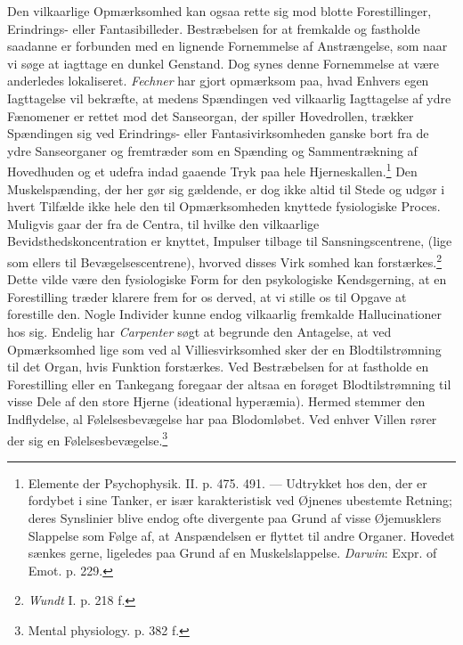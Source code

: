 \documentclass[12pt,a4paper,openany]{book}
\newcommand{\opage}[1]{\marginnote{\footnotesize\textit{[#1]}}}
\begin{document}
Den vilkaarlige Opmærksomhed kan ogsaa rette sig mod blotte
Forestillinger, Erindrings- eller Fantasibilleder. Bestræbelsen for at
fremkalde og fastholde saadanne er forbunden med en lignende Fornemmelse
af Anstrængelse, som naar vi søge at iagttage en dunkel Genstand. Dog
synes denne Fornemmelse at være anderledes lokaliseret. \emph{Fechner}
har gjort opmærksom paa, hvad Enhvers egen Iagttagelse vil bekræfte, at
medens Spændingen ved vilkaarlig Iagttagelse af ydre Fænomener er rettet
mod det Sanseorgan, der spiller Hovedrollen, trækker Spændingen sig ved
Erindrings- eller Fantasivirksomheden ganske bort fra de ydre
Sanseorganer og fremtræder som en Spænding og Sammentrækning af
Hovedhuden og et udefra indad gaaende Tryk paa hele
Hjerneskallen.\footnote[1]{Elemente der Psychophysik. II. p. 475. 491.
--- Udtrykket hos den, der er fordybet i sine Tanker, er især
karakteristisk ved Øjnenes ubestemte Retning; deres Synslinier blive
endog ofte divergente paa Grund af visse Øjemusklers Slappelse som Følge
af, at Anspændelsen er flyttet til andre Organer. Hovedet sænkes gerne,
ligeledes paa Grund af en Muskelslappelse. \emph{Darwin}: Expr. of Emot.
p. 229.} Den Muskelspænding, der her gør sig gældende, er dog ikke altid
til Stede og udgør i hvert Tilfælde ikke hele den til Opmærksomheden
knyttede fysiologiske Proces. Muligvis gaar der fra de Centra, til
hvilke den vilkaarlige Bevidsthedskoncentration er knyttet, Impulser
tilbage til Sansningscentrene, (lige som ellers til Bevægelsescentrene),
hvorved disses Virk%
\opage{374}somhed kan forstærkes.\footnote[1]{\emph{Wundt} I. p. 218 f.} Dette
vilde være den fysiologiske Form for den psykologiske Kendsgerning, at
en Forestilling træder klarere frem for os derved, at vi stille os til
Opgave at forestille den. Nogle Individer kunne endog vilkaarlig
fremkalde Hallucinationer hos sig. Endelig har \emph{Carpenter} søgt at
begrunde den Antagelse, at ved Opmærksomhed lige som ved al
Villiesvirksomhed sker der en Blodtilstrømning til det Organ, hvis
Funktion forstærkes. Ved Bestræbelsen for at fastholde en Forestilling
eller en Tankegang foregaar der altsaa en forøget Blodtilstrømning til
visse Dele af den store Hjerne (ideational hyperæmia). Hermed stemmer
den Indflydelse, al Følelsesbevægelse har paa Blodomløbet. Ved enhver
Villen rører der sig en Følelsesbevægelse.\footnote[2]{Mental
physiology. p. 382 f.}
\end{document}
